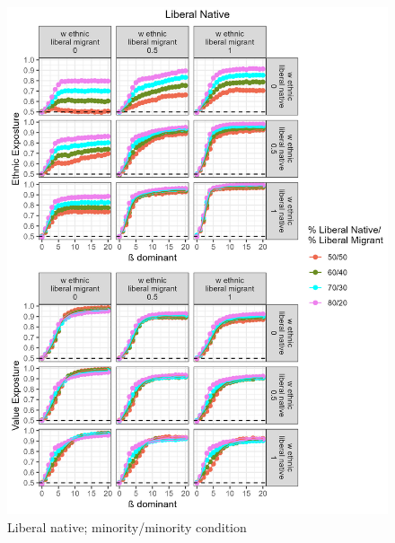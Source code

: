 \documentclass[
]{article}
\begin{document}
\begin{figure}[H]
    \centering
    \includegraphics{images/Liberal Native_vlsz.jpg}
    \caption{Liberal native; minority/minority condition}
    \label{fig:libnat}
\end{figure}
\end{document}
